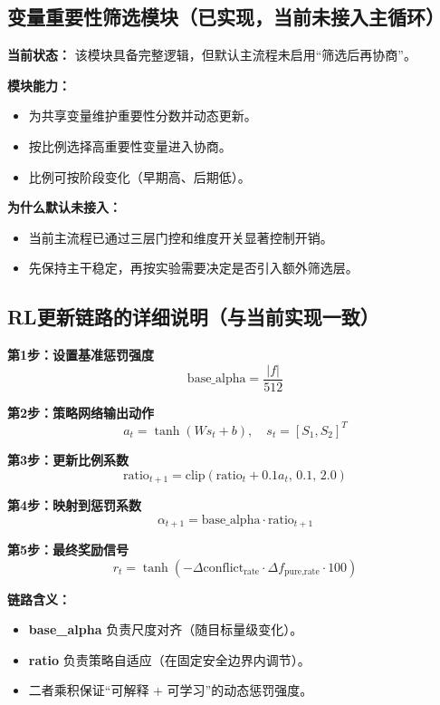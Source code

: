 \documentclass[11pt,a3paper]{ctexart}
\begin{document}
\subsection{变量重要性筛选模块（已实现，当前未接入主循环）}
\textbf{当前状态：} 该模块具备完整逻辑，但默认主流程未启用“筛选后再协商”。

\textbf{模块能力：}
\begin{itemize}
    \item 为共享变量维护重要性分数并动态更新。
    \item 按比例选择高重要性变量进入协商。
    \item 比例可按阶段变化（早期高、后期低）。
\end{itemize}

\textbf{为什么默认未接入：}
\begin{itemize}
    \item 当前主流程已通过三层门控和维度开关显著控制开销。
    \item 先保持主干稳定，再按实验需要决定是否引入额外筛选层。
\end{itemize}

\subsection{RL更新链路的详细说明（与当前实现一致）}
\textbf{第1步：设置基准惩罚强度}
\begin{equation}
\text{base\_alpha} = \frac{|f|}{512}
\end{equation}

\textbf{第2步：策略网络输出动作}
\begin{equation}
a_t=\tanh(Ws_t+b), \quad s_t=[S_1,S_2]^T
\end{equation}

\textbf{第3步：更新比例系数}
\begin{equation}
\text{ratio}_{t+1}=\text{clip}(\text{ratio}_t+0.1a_t,\,0.1,\,2.0)
\end{equation}

\textbf{第4步：映射到惩罚系数}
\begin{equation}
\alpha_{t+1}=\text{base\_alpha}\cdot\text{ratio}_{t+1}
\end{equation}

\textbf{第5步：最终奖励信号}
\begin{equation}
r_t=\tanh\!\left(-\Delta\text{conflict}_{\text{rate}}\cdot\Delta f_{\text{pure,rate}}\cdot100\right)
\end{equation}

\textbf{链路含义：}
\begin{itemize}
    \item \textbf{base\_alpha} 负责尺度对齐（随目标量级变化）。
    \item \textbf{ratio} 负责策略自适应（在固定安全边界内调节）。
    \item 二者乘积保证“可解释 + 可学习”的动态惩罚强度。
\end{itemize}
\end{document}
